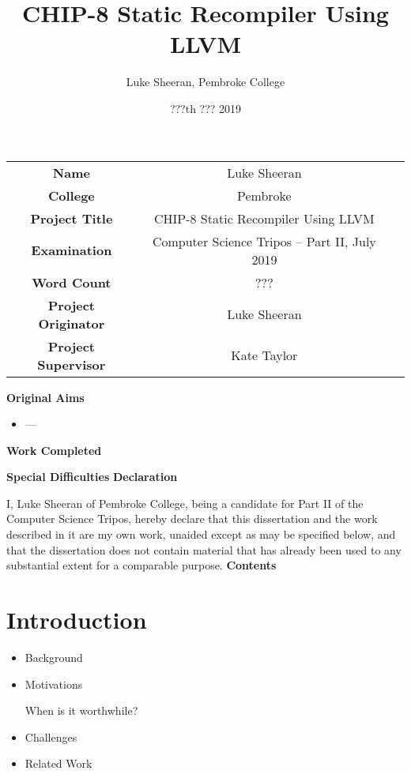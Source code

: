\documentclass[12pt,a4paper,twoside]{article}
\begin{document}
\begin{titlepage}
\title{CHIP-8 Static Recompiler Using LLVM}
\author{Luke Sheeran, Pembroke College}
\date{???th ??? 2019}
\maketitle
\thispagestyle{empty}
\end{titlepage}
\begin{tabular}{ccc}
\textbf{Name} & Luke Sheeran \\
\textbf{College} & Pembroke \\
\textbf{Project Title} &  CHIP-8 Static Recompiler Using LLVM\\
\textbf{Examination} & Computer Science Tripos – Part II, July 2019 \\\textbf{Word Count} & ??? \\\textbf{Project Originator} & Luke Sheeran \\\textbf{Project Supervisor} & Kate Taylor \\
\end{tabular}

\textbf{Original Aims}
\begin{itemize}
\item ---
\end{itemize}
\textbf{Work Completed}

\textbf{Special Difficulties}
\clearpage
\textbf{\LARGE{Declaration}}

I, Luke Sheeran of Pembroke College, being a candidate for Part II of the Computer Science Tripos, hereby declare that this dissertation and the work
described in it are my own work, unaided except as may be specified below, and that
the dissertation does not contain material that has already been used to any substantial
extent for a comparable purpose.
\clearpage
\textbf{\LARGE{Contents}}
\clearpage
\section{Introduction}
\begin{itemize}
\item Background
\item Motivations

When is it worthwhile?

\item Challenges
\item Related Work
\end{itemize}
\clearpage
\end{document}
